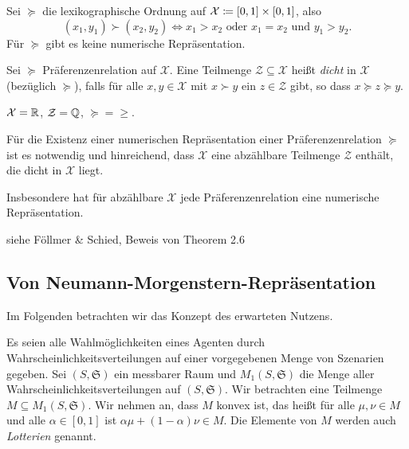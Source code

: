 \documentclass[a4paper,twoside,DIV15,BCOR12mm]{scrbook}
\newcommand{\cX}{\mathcal X}
\begin{document}
\begin{beispiel}
Sei $\succeq$ die lexikographische Ordnung auf $\cX \da [0,1]\times[0,1]$, also\[(x_1,y_1)\succ (x_2,y_2) \iff x_1 > x_2 \text{ oder } x_1 = x_2 \text{ und } y_1 > y_2.\] Für $\succeq$ gibt es keine numerische Repräsentation.
\end{beispiel}

\begin{definition}
Sei $\succeq$ Präferenzenrelation auf $\cX$. Eine Teilmenge $\mathcal Z\subseteq \mathcal X$ heißt \emph{dicht} in $\cX$ (bezüglich $\succeq$), falls für alle $x,y\in\cX$ mit $x\succ y$ ein $z\in\mathcal Z$ gibt, so dass $x\succeq z \succeq y$.
\end{definition}

\begin{beispiel}
$\cX = \MdR$, $\mathcal Z=\mathbb{Q}$, $\succeq = \ge$.
\end{beispiel}

\begin{satz}
Für die Existenz einer numerischen Repräsentation einer Präferenzenrelation $\succeq$ ist es notwendig und hinreichend, dass $\cX$ eine abzählbare Teilmenge $\mathcal Z$ enthält, die dicht in $\cX$ liegt.

Insbesondere hat für abzählbare $\cX$ jede Präferenzenrelation eine numerische Repräsentation.
\end{satz}

\begin{beweis}
siehe Föllmer \& Schied, Beweis von Theorem 2.6
\end{beweis}

\subsection{Von Neumann-Morgenstern-Repräsentation}

Im Folgenden betrachten wir das Konzept des erwarteten Nutzens.

Es seien alle Wahlmöglichkeiten eines Agenten durch Wahrscheinlichkeitsverteilungen auf einer vorgegebenen Menge von Szenarien gegeben. Sei $(S,\mathfrak S)$ ein messbarer Raum und $M_1(S,\mathfrak S)$ die Menge aller Wahrscheinlichkeitsverteilungen auf $(S,\mathfrak S)$. Wir betrachten eine Teilmenge $M\subseteq M_1(S,\mathfrak S)$. Wir nehmen an, dass $M$ konvex ist, das heißt für alle $\mu, \nu\in M$ und alle $\alpha\in[0,1]$ ist $\alpha\mu + (1-\alpha)\nu \in M$. Die Elemente von $M$ werden auch \emph{Lotterien} genannt.
\end{document}
